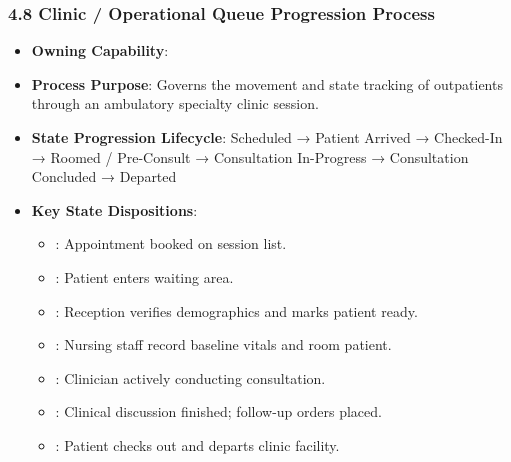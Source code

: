 \par\smallskip
{}\label{rad:processes:187}
\subsubsection*{4.8 Clinic /\allowbreak{} Operational Queue Progression Process}
\label{rad:processes:188}

\begin{itemize}

\item
\textbf{Owning Capability}: \texttt{}



\item
\textbf{Process Purpose}: Governs the movement and state tracking of outpatients through an ambulatory specialty clinic session.



\item
\textbf{State Progression Lifecycle}: Scheduled → Patient Arrived → Checked-In → Roomed /\allowbreak{} Pre-Consult → Consultation In-Progress → Consultation Concluded → Departed



\item
\textbf{Key State Dispositions}:


\begin{itemize}

\item
\texttt{}: Appointment booked on session list.



\item
\texttt{}: Patient enters waiting area.



\item
\texttt{}: Reception verifies demographics and marks patient ready.



\item
\texttt{}: Nursing staff record baseline vitals and room patient.



\item
\texttt{}: Clinician actively conducting consultation.



\item
\texttt{}: Clinical discussion finished; follow-up orders placed.



\item
\texttt{}: Patient checks out and departs clinic facility.



\end{itemize}


\end{itemize}
\label{rad:processes:201}

